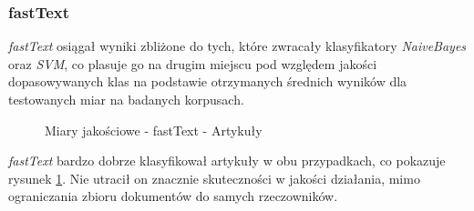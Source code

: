 \subsubsection{fastText}
\textit{fastText} osiągał wyniki zbliżone do tych, które zwracały klasyfikatory \textit{NaiveBayes} oraz \textit{SVM}, co plasuje go na drugim miejscu pod względem jakości dopasowywanych klas na podstawie otrzymanych średnich wyników dla testowanych miar na badanych korpusach.  
\begin{figure}[ht!]
	\centering
    \qquad
	\caption{Miary jakościowe - fastText - Artykuły}
    \label{fig:report-fasttext-articles}
\end{figure}

\textit{fastText} bardzo dobrze klasyfikował artykuły w obu przypadkach, co pokazuje rysunek \ref{fig:report-fasttext-articles}. Nie utracił on znacznie skuteczności w jakości działania, mimo ograniczania zbioru dokumentów do samych rzeczowników. 


